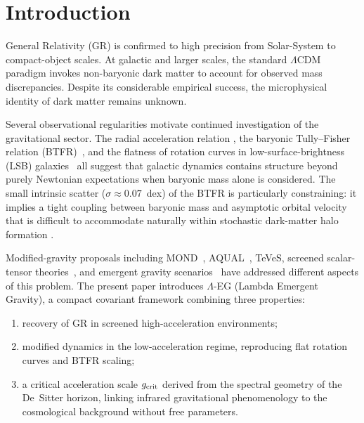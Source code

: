\documentclass[11pt,a4paper]{article}
\begin{document}
\tableofcontents
\newpage

\section{Introduction}
\label{sec:intro}

General Relativity (GR) is confirmed to high precision from Solar-System to compact-object
scales. At galactic and larger scales, the standard $\Lambda$CDM paradigm invokes
non-baryonic dark matter to account for observed mass discrepancies. Despite its
considerable empirical success, the microphysical identity of dark matter remains
unknown.

Several observational regularities motivate continued investigation of the gravitational
sector. The radial acceleration relation \cite{McGaugh2016}, the baryonic
Tully--Fisher relation (BTFR)~\cite{McGaugh2000}, and the flatness of rotation curves
in low-surface-brightness (LSB) galaxies~\cite{Rubin1980} all suggest that galactic
dynamics contains structure beyond purely Newtonian expectations when baryonic mass
alone is considered. The small intrinsic scatter ($\sigma\approx0.07$~dex) of the BTFR
is particularly constraining: it implies a tight coupling between baryonic mass and
asymptotic orbital velocity that is difficult to accommodate naturally within stochastic
dark-matter halo formation \cite{McGaugh2000}.

Modified-gravity proposals including MOND~\cite{Milgrom1983}, AQUAL~\cite{Bekenstein1984},
TeVeS, screened scalar-tensor theories~\cite{Khoury2004, Babichev2009}, and emergent
gravity scenarios~\cite{Verlinde2017} have addressed different aspects of this problem.
The present paper introduces $\Lambda$-EG (Lambda Emergent Gravity), a compact covariant
framework combining three properties:
\begin{enumerate}[label=(\roman*)]
\item recovery of GR in screened high-acceleration environments;
\item modified dynamics in the low-acceleration regime, reproducing flat rotation
      curves and BTFR scaling;
\item a critical acceleration scale $g_{\rm crit}$ derived from the spectral geometry
      of the De~Sitter horizon, linking infrared gravitational phenomenology to the
      cosmological background without free parameters.
\end{enumerate}
\end{document}
